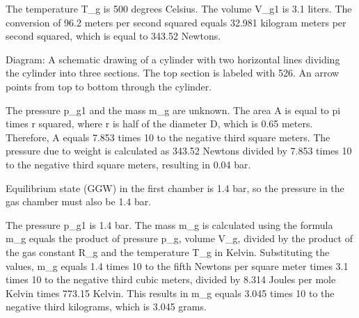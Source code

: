 The temperature T_g is 500 degrees Celsius. The volume V_g1 is 3.1 liters. The conversion of 96.2 meters per second squared equals 32.981 kilogram meters per second squared, which is equal to 343.52 Newtons.

Diagram: A schematic drawing of a cylinder with two horizontal lines dividing the cylinder into three sections. The top section is labeled with 526. An arrow points from top to bottom through the cylinder.

The pressure p_g1 and the mass m_g are unknown. The area A is equal to pi times r squared, where r is half of the diameter D, which is 0.65 meters. Therefore, A equals 7.853 times 10 to the negative third square meters. The pressure due to weight is calculated as 343.52 Newtons divided by 7.853 times 10 to the negative third square meters, resulting in 0.04 bar.

Equilibrium state (GGW) in the first chamber is 1.4 bar, so the pressure in the gas chamber must also be 1.4 bar.

The pressure p_g1 is 1.4 bar. The mass m_g is calculated using the formula m_g equals the product of pressure p_g, volume V_g, divided by the product of the gas constant R_g and the temperature T_g in Kelvin. Substituting the values, m_g equals 1.4 times 10 to the fifth Newtons per square meter times 3.1 times 10 to the negative third cubic meters, divided by 8.314 Joules per mole Kelvin times 773.15 Kelvin. This results in m_g equals 3.045 times 10 to the negative third kilograms, which is 3.045 grams.